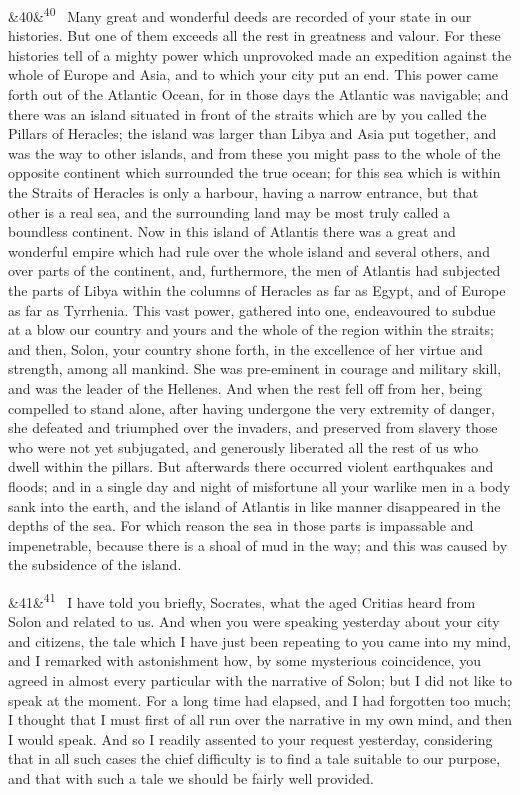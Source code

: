 \documentclass[12pt]{article}
\newcommand{\para}[1][]{\par\noindent\ifx&#1&\else\textsuperscript{\footnotesize #1}~\fi}
\begin{document}
\para[40] Many great and wonderful deeds are recorded of your state in our histories. But one of them exceeds all the rest in greatness and valour. For these histories tell of a mighty power which unprovoked made an expedition against the whole of Europe and Asia, and to which your city put an end. This power came forth out of the Atlantic Ocean, for in those days the Atlantic was navigable; and there was an island situated in front of the straits which are by you called the Pillars of Heracles; the island was larger than Libya and Asia put together, and was the way to other islands, and from these you might pass to the whole of the opposite continent which surrounded the true ocean; for this sea which is within the Straits of Heracles is only a harbour, having a narrow entrance, but that other is a real sea, and the surrounding land may be most truly called a boundless continent. Now in this island of Atlantis there was a great and wonderful empire which had rule over the whole island and several others, and over parts of the continent, and, furthermore, the men of Atlantis had subjected the parts of Libya within the columns of Heracles as far as Egypt, and of Europe as far as Tyrrhenia. This vast power, gathered into one, endeavoured to subdue at a blow our country and yours and the whole of the region within the straits; and then, Solon, your country shone forth, in the excellence of her virtue and strength, among all mankind. She was pre-eminent in courage and military skill, and was the leader of the Hellenes. And when the rest fell off from her, being compelled to stand alone, after having undergone the very extremity of danger, she defeated and triumphed over the invaders, and preserved from slavery those who were not yet subjugated, and generously liberated all the rest of us who dwell within the pillars. But afterwards there occurred violent earthquakes and floods; and in a single day and night of misfortune all your warlike men in a body sank into the earth, and the island of Atlantis in like manner disappeared in the depths of the sea. For which reason the sea in those parts is impassable and impenetrable, because there is a shoal of mud in the way; and this was caused by the subsidence of the island.

\para[41] I have told you briefly, Socrates, what the aged Critias heard from Solon and related to us. And when you were speaking yesterday about your city and citizens, the tale which I have just been repeating to you came into my mind, and I remarked with astonishment how, by some mysterious coincidence, you agreed in almost every particular with the narrative of Solon; but I did not like to speak at the moment. For a long time had elapsed, and I had forgotten too much; I thought that I must first of all run over the narrative in my own mind, and then I would speak. And so I readily assented to your request yesterday, considering that in all such cases the chief difficulty is to find a tale suitable to our purpose, and that with such a tale we should be fairly well provided.
\end{document}
